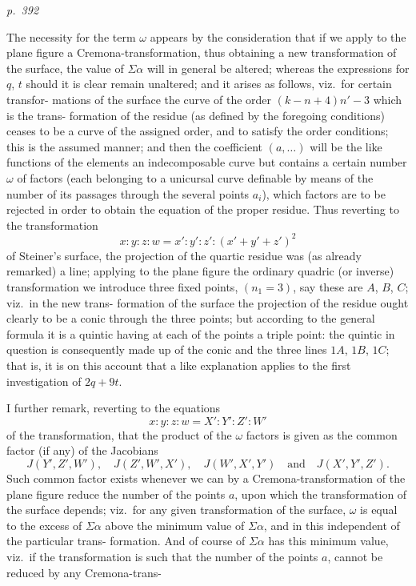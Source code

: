 \documentclass[11pt,a4paper]{book}
\begin{document}
\clearpage

\bigskip
\textit{p.~392}
\smallskip

\noindent
The necessity for the term $\omega$ appears by the consideration that if we apply to
the plane figure a Cremona-transformation, thus obtaining a new transformation of
the surface, the value of $\Sigma\alpha$ will in general be altered; whereas the expressions for $q$, $t$
should it is clear remain unaltered; and it arises as follows, viz.\ for certain transfor-
mations of the surface the curve of the order $(k - n + 4)n' - 3$ which is the trans-
formation of the residue (as defined by the foregoing conditions) ceases to be a curve
of the assigned order, and to satisfy the order conditions; this is the assumed
manner; and then the coefficient $(a, \ldots)$ will be the like functions of the elements
an indecomposable curve but contains a certain number $\omega$ of factors (each belonging
to a unicursal curve definable by means of the number of its passages through the
several points $a_i$), which factors are to be rejected in order to obtain the equation of
the proper residue.  Thus reverting to the transformation
\[
x : y : z : w = x' : y' : z' : (x' + y' + z')^2
\]
of Steiner's surface, the projection of the quartic residue was (as already remarked) a
line; applying to the plane figure the ordinary quadric (or inverse) transformation we
introduce three fixed points, $(n_1 = 3)$, say these are $A$, $B$, $C$; viz.\ in the new trans-
formation of the surface the projection of the residue ought clearly to be a
conic through the three points; but according to the general formula it is a quintic
having at each of the points a triple point: the quintic in question is consequently
made up of the conic and the three lines $1A$, $1B$, $1C$; that is, it is on this account
that a like explanation applies to the first investigation of $2q + 9t$.

I further remark, reverting to the equations
\[
x : y : z : w = X' : Y' : Z' : W'
\]
of the transformation, that the product of the $\omega$ factors is given as the common factor
(if any) of the Jacobians
\[
J(Y', Z', W'), \quad J(Z', W', X'), \quad J(W', X', Y') \quad \text{and} \quad J(X', Y', Z').
\]
Such common factor exists whenever we can by a Cremona-transformation of the plane
figure reduce the number of the points $a$, upon which the transformation of the
surface depends; viz.\ for any given transformation of the surface, $\omega$ is equal to the
excess of $\Sigma\alpha$ above the minimum value of $\Sigma\alpha$, and in this independent of the particular trans-
formation. And of course of $\Sigma\alpha$ has this minimum value, viz.\ if the transformation
is such that the number of the points $a$, cannot be reduced by any Cremona-trans-
\end{document}
